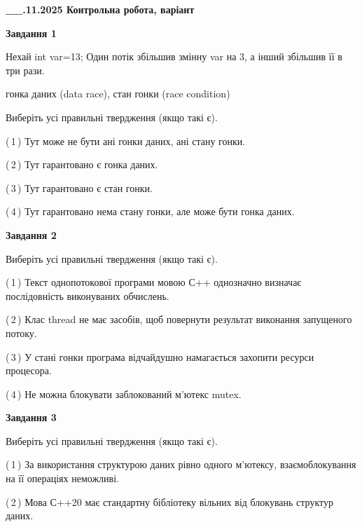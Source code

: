 \documentclass[12pt, ukrainian]{article}
\begin{document}
\begin {large}

\textbf{\_\_.11.2025 Контрольна робота, варіант  }\par


{

\begin{center}
\textbf{Завдання 1}
\end{center}
Нехай int var=13; Один потік збільшив змінну var на 3, а інший збільшив її в три рази.

гонка даних (data race), стан гонки (race condition)

Виберіть усі правильні твердження (якщо такі є).\par
\vspace{2mm}
(\,1\,) Тут може не бути ані гонки даних, ані стану гонки.%

(\,2\,) Тут гарантовано є гонка даних.%

(\,3\,) Тут гарантовано є стан гонки.%

(\,4\,) Тут гарантовано нема стану гонки, але може бути гонка даних.%



\begin{center}
\textbf{Завдання 2}
\end{center}
Виберіть усі правильні твердження (якщо такі є).\par
\vspace{2mm}

(\,1\,) Текст однопотокової програми мовою С++ однозначно визначає послідовність виконуваних обчислень.%

(\,2\,) Клас thread не має засобів, щоб повернути результат виконання запущеного потоку.%

(\,3\,) У стані гонки програма відчайдушно намагається захопити ресурси процесора.%

(\,4\,) Не можна блокувати заблокований м’ютекс mutex.%



\begin{center}
\textbf{Завдання 3}
\end{center}
Виберіть усі правильні твердження (якщо такі є).\par
\vspace{2mm}

(\,1\,) За використання структурою даних рівно одного м’ютексу, взаємоблокування на її операціях неможливі.%

(\,2\,) Мова С++20 має стандартну бібліотеку вільних від блокувань структур даних.%

}
\end{large}
\end{document}
